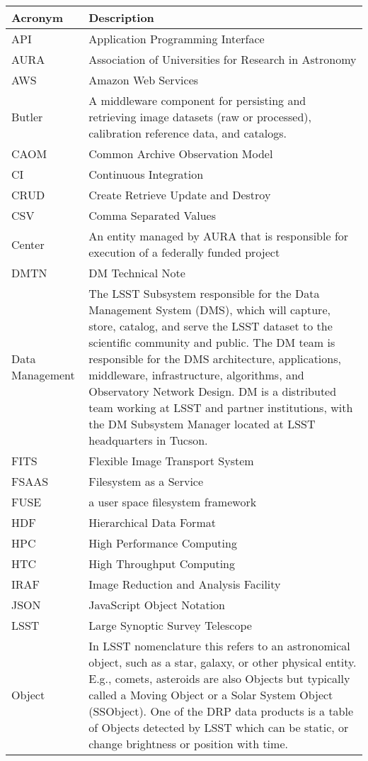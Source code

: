 \addtocounter{table}{-1}
\begin{longtable}{|l|p{}|}\hline
\textbf{Acronym} & \textbf{Description}  \\\hline

API & Application Programming Interface \\\hline
AURA & Association of Universities for Research in Astronomy \\\hline
AWS & Amazon Web Services \\\hline
Butler & A middleware component for persisting and retrieving image datasets (raw or processed), calibration reference data, and catalogs. \\\hline
CAOM & Common Archive Observation Model \\\hline
CI & Continuous Integration \\\hline
CRUD & Create Retrieve Update and Destroy \\\hline
CSV & Comma Separated Values \\\hline
Center & An entity managed by AURA that is responsible for execution of a federally funded project \\\hline
DMTN & DM Technical Note \\\hline
Data Management & The LSST Subsystem responsible for the Data Management System (DMS), which will capture, store, catalog, and serve the LSST dataset to the scientific community and public. The DM team is responsible for the DMS architecture, applications, middleware, infrastructure, algorithms, and Observatory Network Design. DM is a distributed team working at LSST and partner institutions, with the DM Subsystem Manager located at LSST headquarters in Tucson. \\\hline
FITS & Flexible Image Transport System \\\hline
FSAAS & Filesystem as a Service \\\hline
FUSE & a user space filesystem framework \\\hline
HDF & Hierarchical Data Format \\\hline
HPC & High Performance Computing \\\hline
HTC & High Throughput Computing \\\hline
IRAF & Image Reduction and Analysis Facility \\\hline
JSON & JavaScript Object Notation \\\hline
LSST & Large Synoptic Survey Telescope \\\hline
Object & In LSST nomenclature this refers to an astronomical object, such as a star, galaxy, or other physical entity. E.g., comets, asteroids are also Objects but typically called a Moving Object or a Solar System Object (SSObject). One of the DRP data products is a table of Objects detected by LSST which can be static, or change brightness or position with time. \\\hline

\end{longtable}
